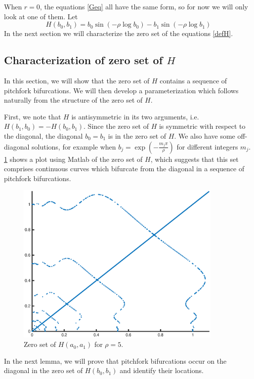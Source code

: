 \documentclass[thesis.tex]{subfiles}
\begin{document}
When $r = 0$, the equations \eqref{Geq} all have the same form, so for now we will only look at one of them. Let
\begin{equation}\label{defH}
H(b_0, b_1) = b_0 \sin \left( -\rho \log b_0 \right) - b_1 \sin \left( -\rho \log b_1 \right)
\end{equation}
In the next section we will characterize the zero set of the equations \cref{defH}. 

\subsection{Characterization of zero set of $H$}

In this section, we will show that the zero set of $H$ contains a sequence of pitchfork bifurcations. We will then develop a parameterization which follows naturally from the structure of the zero set of $H$.

First, we note that $H$ is antisymmetric in its two arguments, i.e. $H(b_1, b_0) = -H(b_0, b_1)$. Since the zero set of $H$ is symmetric with respect to the diagonal, the diagonal $b_0 = b_1$ is in the zero set of $H$. We also have some off-diagonal solutions, for example when $b_j = \exp\left(-\frac{m_j \pi}{\rho}\right)$ for different integers $m_j$. \cref{fig:Fzeronumeric} shows a plot using Matlab of the zero set of $H$, which suggests that this set comprises continuous curves which bifurcate from the diagonal in a sequence of pitchfork bifurcations.

\begin{figure}
\includegraphics[width=10cm]{periodic/zeroset5}
\caption{Zero set of $H(a_0, a_1)$ for $\rho = 5$.}
\label{fig:Fzeronumeric}
\end{figure} 

In the next lemma, we will prove that pitchfork bifurcations occur on the diagonal in the zero set of $H(b_0, b_1)$ and identify their locations.
\end{document}
